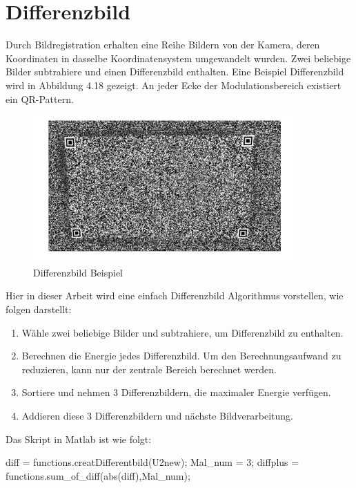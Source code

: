 \section{Differenzbild}
Durch Bildregistration erhalten eine Reihe Bildern von der Kamera, deren Koordinaten in dasselbe Koordinatensystem umgewandelt wurden.
Zwei beliebige Bilder subtrahiere und einen Differenzbild enthalten. Eine Beispiel Differenzbild wird in Abbildung 4.18 gezeigt. An jeder Ecke der Modulationsbereich existiert ein QR-Pattern. 

\begin{figure}[H]
 \centering 
 \includegraphics[keepaspectratio,width=0.9\textwidth]{images/4_ZweiteErfahrung/Kamera/differenzbild.pdf}
 \caption{Differenzbild Beispiel}
 \label{fig:Differenzbild}
\end{figure} 

Hier in dieser Arbeit wird eine einfach Differenzbild Algorithmus vorstellen, wie folgen darstellt:

\begin{enumerate}
	\item Wähle zwei beliebige Bilder und subtrahiere, um Differenzbild zu enthalten.
	\item Berechnen die Energie jedes Differenzbild. Um den Berechnungsaufwand zu reduzieren, kann nur der zentrale Bereich berechnet werden.
	\item Sortiere und nehmen 3 Differenzbildern, die maximaler Energie verfügen.
	\item Addieren diese 3 Differenzbildern und nächste Bildverarbeitung.
\end{enumerate}

Das Skript in Matlab ist wie folgt:
\singlespacing
\begin{matlab}[firstnumber=1, name=MATLABCodeBeispiel, caption={MATLAB Code Binarisierung}, label={lst:MATLABCodeBinarisierung}]

diff = functions.creatDifferentbild(U2new);
Mal_num = 3;
diffplus = functions.sum_of_diff(abs(diff),Mal_num);

\end{matlab}
\onehalfspacing

